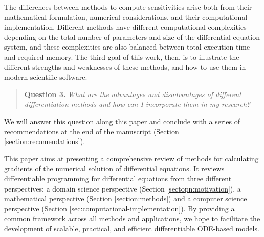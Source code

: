 The differences between methods to compute sensitivities arise both from their mathematical formulation, numerical considerations, and their computational implementation. 
Different methods have different computational complexities depending on the total number of parameters and size of the differential equation system, and these complexities are also balanced between total execution time and required memory. 
The third goal of this work, then, is to illustrate the different strengths and weaknesses of these methods, and how to use them in modern scientific software. 
\begin{quote}
    \textbf{Question 3. }
    \textit{What are the advantages and disadvantages of different differentiation methods and how can I incorporate them in my research?}
\end{quote}
We will answer this question along this paper and conclude with a series of recommendations at the end of the manuscript (Section \ref{section:recomendations}).

This paper aims at presenting a comprehensive review of methods for calculating gradients of the numerical solution of differential equations. 
It reviews differentiable programming for differential equations from three different perspectives: a domain science perspective (Section \ref{sectopn:motivation}), a mathematical perspective (Section \ref{section:methods}) and a computer science perspective (Section \ref{sec:computational-implementation}). 
By providing a common framework across all methods and applications, we hope to facilitate the development of scalable, practical, and efficient differentiable ODE-based models. 


